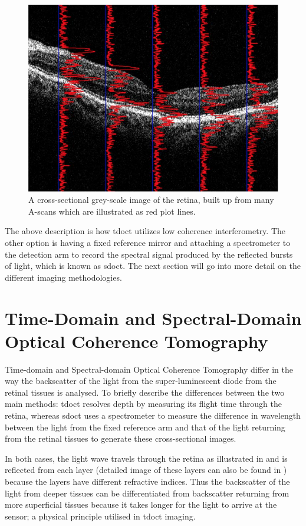 \begin{figure}[H]
\centering
\includegraphics{figures/morgan_3}
\caption{A cross-sectional grey-scale image of the retina, built up from many A-scans which are illustrated as red plot lines. \cite{mbib_6} }
\label{fig:m_3}
\end{figure}


The above description is how \Gls{tdoct} utilizes low coherence interferometry.
The other option is having a fixed reference mirror and attaching a spectrometer to
the detection arm to record the spectral signal produced by the reflected
bursts of light, which is known as \Gls{sdoct}.\cite{mbib_3} The next
section will go into more detail on the different imaging methodologies.

\section{Time-Domain and Spectral-Domain Optical Coherence Tomography}
Time-domain and Spectral-domain Optical Coherence Tomography differ in the way
the backscatter of the light from the super-luminescent diode from the retinal
tissues is analysed.  To briefly describe the differences between the two main
methods: \Gls{tdoct} resolves depth by measuring its flight time through the retina,
whereas \Gls{sdoct} uses a spectrometer to measure the difference in wavelength
between the light from the fixed reference arm and that of the light returning
from the retinal tissues to generate these cross-sectional images.\cite{mbib_7}

In both cases, the light wave travels through the retina as illustrated in  and
is reflected from each layer (detailed image of these layers can also be
found in ) because the layers have different refractive indices.
Thus the backscatter of the light from deeper tissues can be differentiated from
backscatter returning from more superficial tissues because it takes longer for
the light to arrive at the sensor; a physical principle utilised in \Gls{tdoct}
imaging.\cite{mbib_4}

